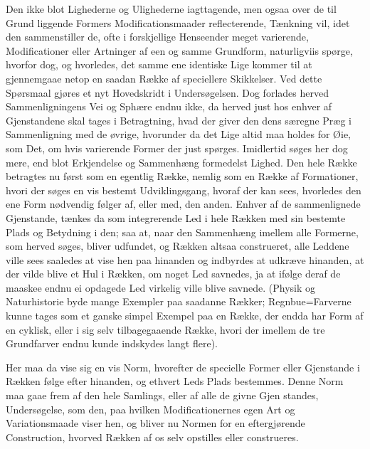 \documentclass[12pt]{book}
\def\textit#1{#1}%
\def\emph#1{#1}%
\newcommand{\opage}[1]{\marginnote{\footnotesize\textit{[#1]}}}
\begin{document}
Den ikke blot Lighederne og Ulighederne iagttagende, men ogsaa over de til Grund
liggende Formers Modificationsmaader reflecterende, Tænkning vil, idet den
sammenstiller de, ofte i forskjellige Henseender meget varierende,
Modificationer eller Artninger af een og samme Grundform, naturligviis spørge,
hvorfor dog, og hvorledes, det samme ene identiske Lige kommer til at gjennemgaae
netop en saadan Række af speciellere Skikkelser. Ved dette Spørsmaal gjøres et
nyt Hovedskridt i Undersøgelsen. Dog forlades herved Sammenligningens Vei og
Sphære endnu ikke, da herved just hos enhver af Gjenstandene skal tages i
Betragtning, hvad der giver den dens særegne Præg i Sammenligning
\opage{202} med de øvrige, hvorunder da det Lige altid maa holdes for Øie, som Det, om hvis
varierende Former der just spørges. Imidlertid søges her dog mere, end blot
Erkjendelse og Sammenhæng formedelst Lighed. Den hele Række betragtes nu først
som en egentlig \emph{Række}, nemlig som en Række af Formationer, hvori der søges
en vis bestemt Udviklingsgang, hvoraf der kan sees, hvorledes den ene Form
nødvendig følger af, eller med, den anden. Enhver af de sammenlignede Gjenstande,
tænkes da som integrerende Led i hele Rækken med sin bestemte Plads og Betydning
i den; saa at, naar den Sammenhæng imellem alle Formerne, som herved søges,
bliver udfundet, og Rækken altsaa construeret, alle Leddene ville sees saaledes
at vise hen paa hinanden og indbyrdes at udkræve hinanden, at der vilde blive et
Hul i Rækken, om noget Led savnedes, ja at ifølge deraf de maaskee endnu ei
opdagede Led virkelig ville blive savnede. (Physik og Naturhistorie byde mange
Exempler paa saadanne Rækker; Regnbue=Farverne kunne tages som et ganske simpel
Exempel paa en Række, der endda har Form af en \emph{cyklisk}, eller i sig selv
tilbagegaaende Række, hvori der imellem de tre Grundfarver endnu kunde indskydes
langt flere).

Her maa da vise sig en vis \emph{Norm}, hvorefter de specielle Former eller
Gjenstande i Rækken følge efter hinanden, og ethvert Leds Plads bestemmes. Denne
Norm maa gaae frem af den hele Samlings, eller af alle de givne Gjen%
\opage{203}standes, Undersøgelse, som den, paa hvilken Modificationernes egen Art og
Variationsmaade viser hen, og bliver nu Normen for en eftergjørende Construction,
hvorved Rækken af os selv opstilles eller construeres.
\end{document}
